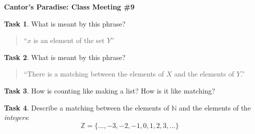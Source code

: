 \documentclass[12pt]{amsart}
\theoremstyle{definition}
\newtheorem{task}{Task}
\begin{document}
\begin{center}
\textbf{\Huge
Cantor's Paradise: Class Meeting \#9
}
\end{center}


\vspace{.5in}

\begin{task}
What is meant by this phrase?
\begin{quote}
``$x$ is an element of the set $Y$''
\end{quote}
\end{task}

\vspace{3in}

\begin{task}
What is meant by this phrase?
\begin{quote}
``There is a matching between the elements of $X$ and the elements of $Y$.''
\end{quote}
\end{task}

\clearpage

\begin{task}
How is counting like making a list? How is it like matching?
\end{task}

\vspace{3.5in}

\begin{task}
Describe a matching between the elements of $\mathbb{N}$ and the elements of the \emph{integers}:
\[
\mathbb{Z} = \{ \ldots, -3, -2, -1, 0, 1, 2, 3, \ldots \}
\]
\end{task}
\end{document}
